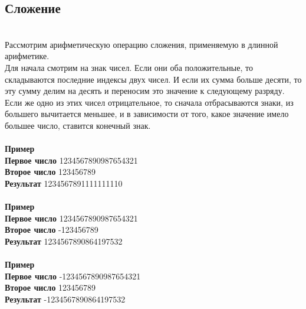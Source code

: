 \documentclass[a4paper]{article}
\begin{document}
\subsection{Сложение}
\\Рассмотрим арифметическую операцию сложения, применяемую в длинной арифметике.
\\Для начала смотрим на знак чисел. Если они оба положительные, то складываются последние индексы двух чисел. И если их сумма больше десяти, то эту сумму делим на десять и переносим это значение к следующему разряду.
\\Если же одно из этих чисел отрицательное, то сначала отбрасываются знаки, из большего вычитается меньшее, и в зависимости от того, какое значение имело большее число, ставится конечный знак.
\\
\\ \textbf{Пример}
\\ \textbf{Первое число} 1234567890987654321
\\ \textbf{Второе число} 123456789
\\ \textbf{Результат} 1234567891111111110
\\
\\ \textbf{Пример}
\\ \textbf{Первое число} 1234567890987654321
\\ \textbf{Второе число} -123456789
\\ \textbf{Результат} 1234567890864197532
\\
\\ \textbf{Пример}
\\ \textbf{Первое число} -1234567890987654321
\\ \textbf{Второе число} 123456789
\\ \textbf{Результат} -1234567890864197532
\end{document}
